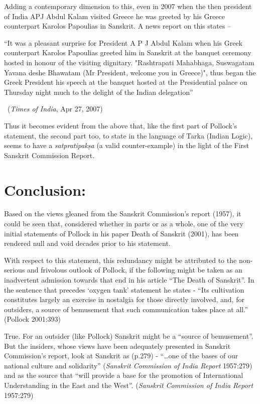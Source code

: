 Adding a contemporary dimension to this, even in 2007 when the then president of India APJ Abdul Kalam visited Greece he was greeted by his Greece counterpart Karolos Papoulias in Sanskrit. A news report on this states –
\begin{myquote}
\eleven
“It was a pleasant surprise for President A P J Abdul Kalam when his Greek counterpart Karolos Papoulias greeted him in Sanskrit at the banquet ceremony hosted in honour of the visiting dignitary.  "Rashtrapati Mahabhaga, Suswagatam Yavana deshe Bhawatam (Mr President, welcome you in Greece)", thus began the Greek President his speech at the banquet hosted at the Presidential palace on Thursday night much to the delight of the Indian delegation” 
\vskip -5pt

~\hfill ({\sl Times of India}, Apr 27, 2007) 
\end{myquote}

Thus it becomes evident from the above that, like the first part of Pollock’s statement, the second part too, to state in the language of Tarka (Indian Logic), seems to have a {\sl satpratipakṣa} (a valid counter-example) in the light of the First Sanskrit Commission Report.

\section{Conclusion:}

Based on the views gleaned from the Sanskrit Commission’s report (1957), it could be seen that, considered whether in parts or as a whole, one of the very initial statements of Pollock in his paper Death of Sanskrit (2001), has been rendered null and void decades prior to his statement.

With respect to this statement, this redundancy might be attributed to the non-serious and frivolous outlook of Pollock, if the following might be taken as an inadvertent admission towards that end in his article “The Death of Sanskrit”. In the sentence that precedes ‘oxygen tank’ statement he states - “Its cultivation constitutes largely an exercise in nostalgia for those directly involved, and, for outsiders, a source of bemusement that such communication takes place at all.” (Pollock  2001:393)

True. For an outsider (like Pollock) Sanskrit might be a “source of bemusement”. But the insiders, whose views have been adequately presented in Sanskrit Commission’s report, look at Sanskrit as (p.279) - “…one of the bases of our national culture and solidarity” ({\sl Sanskrit Commission of India Report} 1957:279) and as the source that “will provide a base for the promotion of International Understanding in the East and the West”. ({\sl Sanskrit Commission of India Report} 1957:279)

